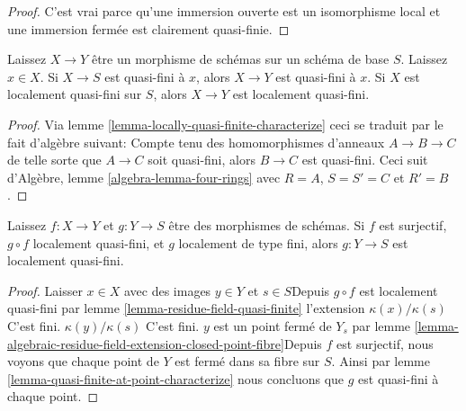 \begin{proof}

C'est vrai parce qu'une immersion ouverte est un isomorphisme local et une immersion fermée est clairement quasi-finie.

\end{proof}

\begin{lemma}

\label{lemma-permanence-quasi-finite}
Laissez $X \to Y$ être un morphisme de schémas sur un schéma de base $S$. Laissez $x \in X$. Si $X \to S$ est quasi-fini à $x$, alors $X \to Y$ est quasi-fini à $x$. Si $X$ est localement quasi-fini sur $S$, alors $X \to Y$ est localement quasi-fini.
\end{lemma}

\begin{proof}
Via lemme \ref{lemma-locally-quasi-finite-characterize} ceci se traduit par le fait d'algèbre suivant: Compte tenu des homomorphismes d'anneaux $A \to B \to C$ de telle sorte que $A \to C$ soit quasi-fini, alors $B \to C$ est quasi-fini. Ceci suit d'Algèbre, lemme \ref{algebra-lemma-four-rings} avec $R = A$, $S = S' = C$ et $R' = B$.
\end{proof}

\begin{lemma}

\label{lemma-quasi-finite-local-source}
Laissez $f : X \to Y$ et $g : Y \to S$ être des morphismes de schémas. Si $f$ est surjectif, $g \circ f$ localement quasi-fini, et $g$ localement de type fini, alors $g : Y \to S$ est localement quasi-fini.
\end{lemma}

\begin{proof}

Laisser $x \in X$ avec des images $y \in Y$ et $s \in S$Depuis $g \circ f$ est localement quasi-fini par lemme \ref{lemma-residue-field-quasi-finite}
l'extension $\kappa(x)/\kappa(s)$ C'est fini. $\kappa(y)/\kappa(s)$ C'est fini.
$y$ est un point fermé de $Y_s$ par lemme \ref{lemma-algebraic-residue-field-extension-closed-point-fibre}Depuis $f$ est surjectif, nous voyons que chaque point de $Y$ est fermé dans sa fibre sur $S$. Ainsi par lemme \ref{lemma-quasi-finite-at-point-characterize}
nous concluons que $g$ est quasi-fini à chaque point.

\end{proof}














